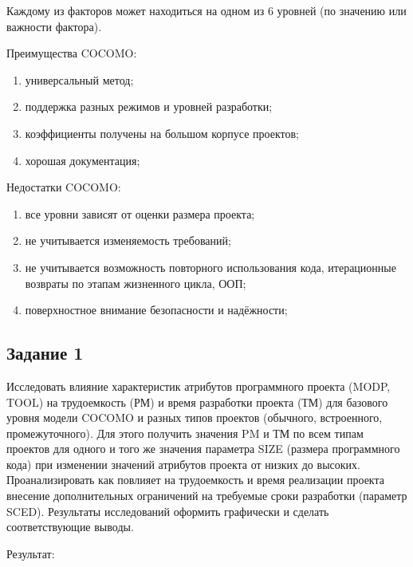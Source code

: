 Каждому из факторов может находиться на одном из 6 уровней (по значению или важности фактора).

Преимущества COCOMO:

\begin{enumerate}
	\item универсальный метод;
	\item поддержка разных режимов и уровней разработки;
	\item коэффициенты получены на большом корпусе проектов;
	\item хорошая документация;
\end{enumerate}

Недостатки COCOMO:

\begin{enumerate}
	\item все уровни зависят от оценки размера проекта;
	\item не учитывается изменяемость требований;
	\item не учитывается возможность повторного использования кода, итерационные возвраты по этапам жизненного цикла, ООП;
	\item поверхностное внимание безопасности и надёжности;
\end{enumerate}

\subsection{Задание 1}

Исследовать влияние характеристик атрибутов программного проекта (MODP, TOOL) 
на трудоемкость (РМ) и время разработки проекта (ТМ) для базового уровня модели COCOMO и разных типов проектов 
(обычного, встроенного, промежуточного).
Для этого получить значения PM и ТМ по всем типам проектов для одного и того же значения параметра SIZE (размера программного кода) 
при изменении значений атрибутов проекта от низких до высоких. Проанализировать как повлияет на трудоемкость и 
время реализации проекта внесение дополнительных ограничений на требуемые сроки разработки (параметр SCED). 
Результаты исследований оформить графически и сделать соответствующие выводы.

Результат:

